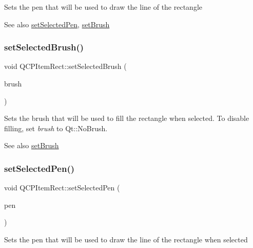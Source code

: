 Sets the pen that will be used to draw the line of the rectangle

\begin{DoxySeeAlso}{See also}
\hyperlink{class_q_c_p_item_rect_a52a1bcb2dc753a538e406a2ba3cf21ce}{set\+Selected\+Pen}, \hyperlink{class_q_c_p_item_rect_abbd4e346a03513ee466afc25d9c75446}{set\+Brush} 
\end{DoxySeeAlso}
\hypertarget{class_q_c_p_item_rect_abd1792859844118dedee86223cede7af}{}\label{class_q_c_p_item_rect_abd1792859844118dedee86223cede7af} 
\subsubsection{\texorpdfstring{set\+Selected\+Brush()}{setSelectedBrush()}}
{\footnotesize\ttfamily void Q\+C\+P\+Item\+Rect\+::set\+Selected\+Brush (\begin{DoxyParamCaption}\item[{const Q\+Brush \&}]{brush }\end{DoxyParamCaption})}

Sets the brush that will be used to fill the rectangle when selected. To disable filling, set {\itshape brush} to Qt\+::\+No\+Brush.

\begin{DoxySeeAlso}{See also}
\hyperlink{class_q_c_p_item_rect_abbd4e346a03513ee466afc25d9c75446}{set\+Brush} 
\end{DoxySeeAlso}
\hypertarget{class_q_c_p_item_rect_a52a1bcb2dc753a538e406a2ba3cf21ce}{}\label{class_q_c_p_item_rect_a52a1bcb2dc753a538e406a2ba3cf21ce} 
\subsubsection{\texorpdfstring{set\+Selected\+Pen()}{setSelectedPen()}}
{\footnotesize\ttfamily void Q\+C\+P\+Item\+Rect\+::set\+Selected\+Pen (\begin{DoxyParamCaption}\item[{const Q\+Pen \&}]{pen }\end{DoxyParamCaption})}

Sets the pen that will be used to draw the line of the rectangle when selected

